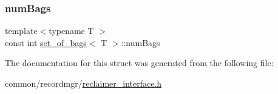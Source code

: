 \mbox{\label{structset__of__bags_ae2c6de80fdeed02cd5c87aa207dd8458}} 
\subsubsection{\texorpdfstring{num\+Bags}{numBags}}
{\footnotesize\ttfamily template$<$typename T $>$ \\
const int \hyperlink{structset__of__bags}{set\+\_\+of\+\_\+bags}$<$ T $>$\+::num\+Bags}



The documentation for this struct was generated from the following file\+:\begin{DoxyCompactItemize}
\item 
common/recordmgr/\hyperlink{reclaimer__interface_8h}{reclaimer\+\_\+interface.\+h}\end{DoxyCompactItemize}
